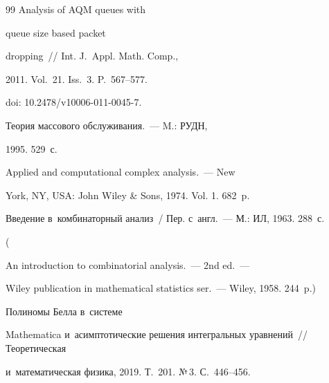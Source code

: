 {{\begin{thebibliography}{99}
 Analysis of AQM queues with 

queue size based packet

dropping~/\!\!/ Int. J.~Appl. Math. Comp.,

2011. Vol.~21. Iss.~3. P.~567--577.

doi: 10.2478\!/\!v10006-011-0045-7.













 Теория массового обслуживания.~--- M.: РУДН, 

1995. 529~с.




 Applied and computational complex analysis.~--- New

York, NY, USA: John Wiley \& Sons, 1974. Vol. 1. 682~p.




 Введение в~комбинаторный анализ~/ Пер. с~англ.~--- М.: ИЛ, 1963. 288~с.

(  

{An introduction to combinatorial analysis}.~---  2nd ed.~---

Wiley publication in mathematical statistics ser.~--- Wiley, 1958. 244~p.)




 Полиномы Белла в~сис\-те\-ме 

Mathematica и~асимптотические решения интегральных уравнений~/\!\!/ Теоретическая 

и~математическая физика, 2019. Т.~201. №\,3. С.~446--456.










\end{thebibliography}}}

